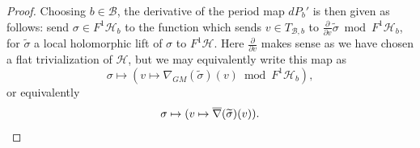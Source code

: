 \documentclass[12 pt]{amsart}
\theoremstyle{plain}
\theoremstyle{definition}
\theoremstyle{remark}
\numberwithin{equation}{section}
\DeclareMathOperator\rk{rk}
\DeclareMathOperator\id{id}
\begin{document}
\begin{proof}
	Choosing $b \in \mathscr B$, the derivative of the period map $dP_b'$ is then given as follows:
	send 
	$\sigma \in F^1 \mathscr H_b$ to the function which sends
	$v \in T_{\mathscr B,b}$ to $\frac{\partial }{\partial v} \widetilde{\sigma} \bmod F^1
	\mathscr H_b$,
	for $\widetilde{\sigma}$ a local holomorphic lift of $\sigma$ to $F^1
	\mathscr H$. Here $\frac{\partial }{\partial v}$ makes sense as we have
	chosen a flat trivialization of $\mathscr{H}$, but we may equivalently
	write this map as $$\sigma \mapsto (v \mapsto \nabla_{GM}(\widetilde{\sigma})(v)
	\bmod F^1\mathscr{H}_b),$$
	or equivalently 
	\begin{equation*}
	\sigma \mapsto (v \mapsto
	\overline{\nabla}(\widetilde{\sigma})(v)).\qedhere
\end{equation*}
%
\end{proof}
\end{document}

